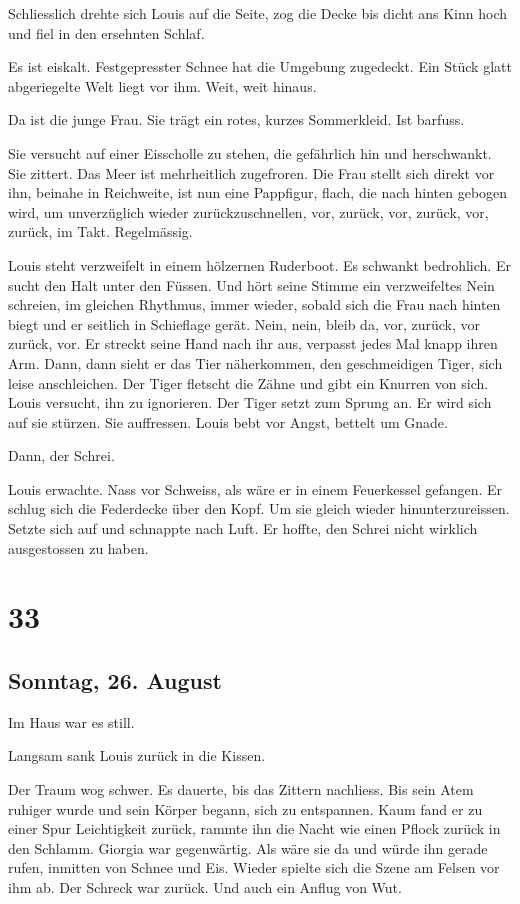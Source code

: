 Schliesslich drehte sich Louis auf die Seite, zog die Decke bis dicht
ans Kinn hoch und fiel in den ersehnten Schlaf.

Es ist eiskalt. Festgepresster Schnee hat die Umgebung zugedeckt. Ein
Stück glatt abgeriegelte Welt liegt vor ihm. Weit, weit hinaus.

Da ist die junge Frau. Sie trägt ein rotes, kurzes Sommerkleid. Ist
barfuss.

Sie versucht auf einer Eisscholle zu stehen, die gefährlich hin und
herschwankt. Sie zittert. Das Meer ist mehrheitlich zugefroren. Die Frau
stellt sich direkt vor ihn, beinahe in Reichweite, ist nun eine
Pappfigur, flach, die nach hinten gebogen wird, um unverzüglich wieder
zurückzuschnellen, vor, zurück, vor, zurück, vor, zurück, im Takt.
Regelmässig.

Louis steht verzweifelt in einem hölzernen Ruderboot. Es schwankt
bedrohlich. Er sucht den Halt unter den Füssen. Und hört seine Stimme
ein verzweifeltes Nein schreien, im gleichen Rhythmus, immer wieder,
sobald sich die Frau nach hinten biegt und er seitlich in Schieflage
gerät. Nein, nein, bleib da, vor, zurück, vor zurück, vor. Er streckt
seine Hand nach ihr aus, verpasst jedes Mal knapp ihren Arm. Dann, dann
sieht er das Tier näherkommen, den geschmeidigen Tiger, sich leise
anschleichen. Der Tiger fletscht die Zähne und gibt ein Knurren von
sich. Louis versucht, ihn zu ignorieren. Der Tiger setzt zum Sprung an.
Er wird sich auf sie stürzen. Sie auffressen. Louis bebt vor Angst,
bettelt um Gnade.

Dann, der Schrei.

Louis erwachte. Nass vor Schweiss, als wäre er in einem Feuerkessel
gefangen. Er schlug sich die Federdecke über den Kopf. Um sie gleich
wieder hinunterzureissen. Setzte sich auf und schnappte nach Luft. Er
hoffte, den Schrei nicht wirklich ausgestossen zu haben.

\chapter{33}\label{section-32}

\section{Sonntag, 26. August}\label{sonntag-26.-august}

Im Haus war es still.

Langsam sank Louis zurück in die Kissen.

Der Traum wog schwer. Es dauerte, bis das Zittern nachliess. Bis sein
Atem ruhiger wurde und sein Körper begann, sich zu entspannen. Kaum fand
er zu einer Spur Leichtigkeit zurück, rammte ihn die Nacht wie einen
Pflock zurück in den Schlamm. Giorgia war gegenwärtig. Als wäre sie da
und würde ihn gerade rufen, inmitten von Schnee und Eis. Wieder spielte
sich die Szene am Felsen vor ihm ab. Der Schreck war zurück. Und auch
ein Anflug von Wut.


